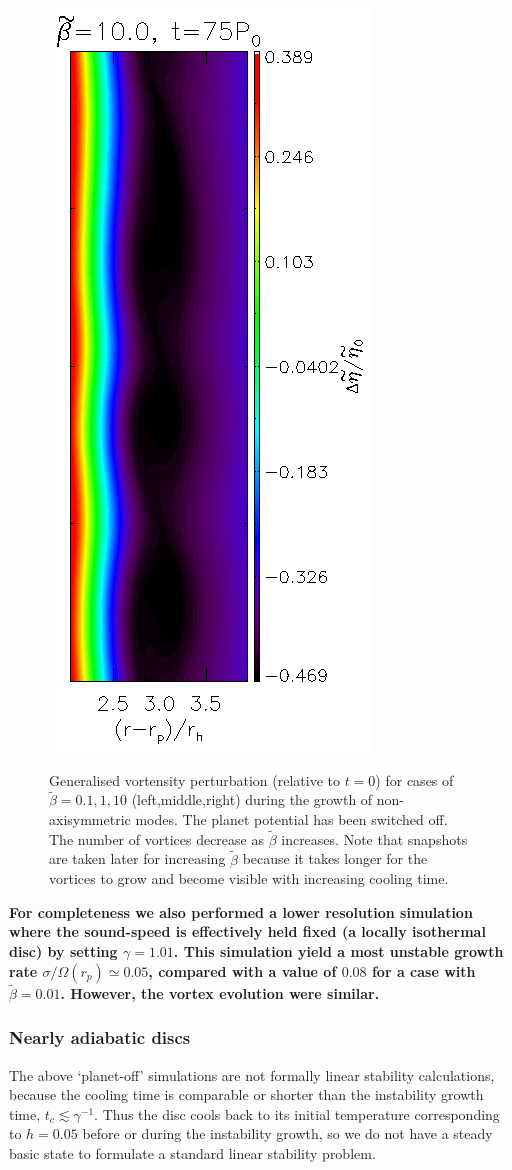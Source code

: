 \begin{figure}
{    \includegraphics[width=0.3\linewidth]{figures/analysis_gvortensity75}
  }  
  \caption{Generalised vortensity perturbation (relative to $t=0$) for
    cases of $\tilde{\beta}=0.1,1,10$ (left,middle,right) during
    the growth of non-axisymmetric modes. The planet potential has
    been switched off.  The number of vortices
    decrease as $\tilde{\beta}$ increases. Note that snapshots are
    taken later for increasing $\tilde{\beta}$ because it takes longer
    for the vortices to grow and become visible with increasing cooling time. 
    \label{2Dlinear} 
  } 
\end{figure}

{\bf For completeness we also performed a lower resolution simulation
  where the sound-speed is effectively held fixed (a locally
  isothermal disc) by setting $\gamma=1.01$. This simulation
  yield a most unstable growth rate $\sigma/\Omega(r_p)\simeq 0.05$,
  compared with a value of $0.08$ for a case with
  $\tilde{\beta}=0.01$. However, the vortex evolution were similar.}  

\subsubsection{Nearly adiabatic discs}
\label{adiabatic_section}

The above `planet-off' simulations are not formally linear
stability calculations, because the cooling time is comparable or shorter
than the instability growth time, $t_c\lesssim\gamma^{-1}$.  
Thus the disc cools back to its initial temperature corresponding to
$h=0.05$ before or during the instability growth, so we do not 
have a steady basic state to formulate a standard linear stability 
problem. 

